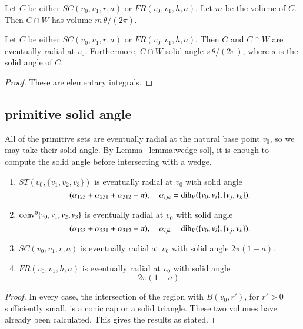 \begin{lemma}  Let $C$ be either $SC(v_0,v_1,r,a)$ or
   $FR(v_0,v_1,h,a)$.  Let $m$ be the volume of $C$.  
   Then $C\cap W$ has volume $m\,\theta/(2\pi)$.   
\end{lemma}

\begin{lemma}  Let $C$ be either $SC(v_0,v_1,r,a)$ or
   $FR(v_0,v_1,h,a)$.  Then $C$ and $C\cap W$ are eventually 
radial at $v_0$. Furthermore,
    $C\cap W$ solid angle 
  $s\,\theta/(2\pi)$, where $s$ is the solid angle of $C$.
\end{lemma}


\begin{proof}
These are elementary integrals.
\end{proof}


\subsection{primitive solid angle}

All of the primitive sets are eventually radial at the natural
base point $v_0$, so we may take their
solid angle.  By Lemma~\ref{lemma:wedge-sol}, it is enough to compute
the solid angle before intersecting with a wedge.

\begin{lemma} 
\begin{enumerate}
    \item  $ST(v_0,\{v_1,v_2,v_3\})$ is eventually radial at $v_0$
     with solid angle 
     $$
     (\alpha_{123}+\alpha_{231}+\alpha_{312}-\pi),\quad
     \alpha_{ijk}=\operatorname{dih}_V(\{v_0,v_i\},\{v_j,v_k\}).
     $$
    \item ${\operatorname{conv}}^0\{v_0,v_1,v_2,v_3\}$ is eventually radial at $v_0$
      with solid angle
           $$
     (\alpha_{123}+\alpha_{231}+\alpha_{312}-\pi),\quad
     \alpha_{ijk}=\operatorname{dih}_V(\{v_0,v_i\},\{v_j,v_k\}).
     $$
    \item $SC(v_0,v_1,r,a)$ is eventually radial at $v_0$ with solid
      angle 
      $2\pi(1-a)$.
    \item $FR(v_0,v_1,h,a)$ is eventually radial at $v_0$ with solid
      angle
        $$
        2\pi (1-a).
        $$
\end{enumerate}
\end{lemma}

\begin{proof} In every case, the intersection of 
  the region with $B(v_0,r')$, for $r'>0$ sufficiently small, is
  a conic cap or a solid triangle.  These two volumes have
  already been calculated.  This gives the results as stated.
\end{proof}

